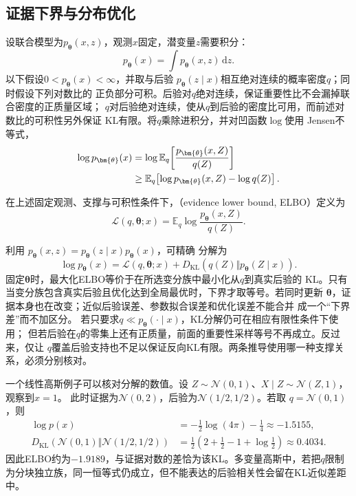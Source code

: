 \subsection{证据下界与分布优化}
设联合模型为\(p_{\bm{\theta}}(x,z)\)，观测\(x\)固定，潜变量\(z\)需要积分：
\[
  p_{\bm{\theta}}(x)=\int p_{\bm{\theta}}(x,z)\,\mathrm{d}z.
\]
以下假设\(0<p_{\bm{\theta}}(x)<\infty\)，并取与后验
\(p_{\bm{\theta}}(z\mid x)\)相互绝对连续的概率密度\(q\)；同时假设下列对数比的
正负部分可积。后验对\(q\)绝对连续，保证重要性比不会漏掉联合密度的正质量区域；
\(q\)对后验绝对连续，使从\(q\)到后验的密度比可用，而前述对数比的可积性另外保证
KL有限。将\(q\)乘除进积分，并对凹函数\(\log\)使用
Jensen不等式，
\begin{align}
  \log p_{\bm{\theta}}(x)
  &=\log\mathbb{E}_{q}\!\left[
    \frac{p_{\bm{\theta}}(x,Z)}{q(Z)}\right]\notag\\
  &\geq\mathbb{E}_{q}\!\left[
    \log p_{\bm{\theta}}(x,Z)-\log q(Z)\right].
  \label{eq:information-elbo-jensen}
\end{align}
\begin{definition}[证据下界]
  \label{def:information-elbo}
  在上述固定观测、支撑与可积性条件下，（evidence lower bound, ELBO）定义为
  \[ \mathcal L(q,\bm\theta;x)
       =\mathbb E_q\log\frac{p_{\bm\theta}(x,Z)}{q(Z)}. \]
\end{definition}
利用
\(p_{\bm{\theta}}(x,z)=p_{\bm{\theta}}(z\mid x)p_{\bm{\theta}}(x)\)，可精确
分解为
\begin{equation}
  \log p_{\bm{\theta}}(x)
  =\mathcal{L}(q,\bm{\theta};x)+
  D_{\mathrm{KL}}\!\left(
    q(Z)\Vert p_{\bm{\theta}}(Z\mid x)\right).
  \label{eq:information-elbo-decomposition}
\end{equation}
固定\(\bm{\theta}\)时，最大化ELBO等价于在所选变分族中最小化从\(q\)到真实后验的
KL。只有当变分族包含真实后验且优化达到全局最优时，下界才取等号。若同时更新
\(\bm{\theta}\)，证据本身也在改变；近似后验误差、参数拟合误差和优化误差不能合并
成一个“下界差”而不加区分。
若只要求\(q\ll p_{\bm{\theta}}(\cdot\mid x)\)，KL分解仍可在相应有限性条件下使用；
但若后验在\(q\)的零集上还有正质量，前面的重要性采样等号不再成立。反过来，仅让
\(q\)覆盖后验支持也不足以保证反向KL有限。两条推导使用哪一种支撑关系，必须分别核对。

一个线性高斯例子可以核对分解的数值。设
\(Z\sim\mathcal N(0,1)\)、\(X\mid Z\sim\mathcal N(Z,1)\)，观察到\(x=1\)。
此时证据为\(\mathcal N(0,2)\)，后验为\(\mathcal N(1/2,1/2)\)。若取
\(q=\mathcal N(0,1)\)，则
\[
\begin{aligned}
  \log p(x)&=-\frac12\log(4\pi)-\frac14\approx-1.5155,\\
  D_{\mathrm{KL}}\!\left(
    \mathcal N(0,1)\Vert\mathcal N(1/2,1/2)
  \right)
  &=\frac12\left(2+\frac12-1+\log\frac12\right)
  \approx0.4034.
\end{aligned}
\]
因此ELBO约为\(-1.9189\)，与证据对数的差恰为该KL。多变量高斯中，若把\(q\)限制
为分块独立族，同一恒等式仍成立，但不能表达的后验相关性会留在KL近似差距中。
